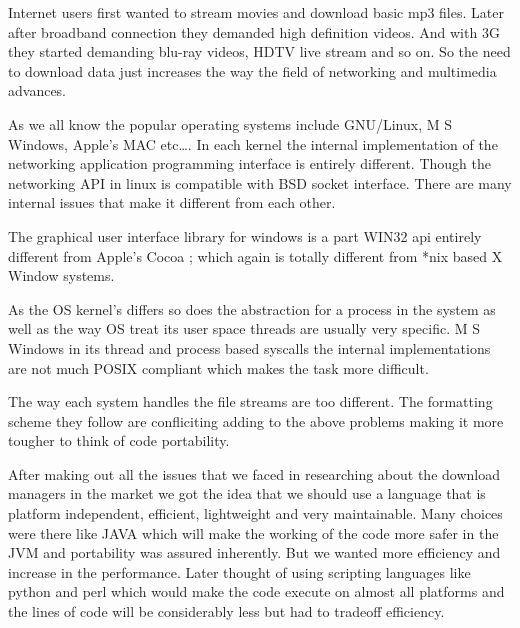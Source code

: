 \documentclass[pdftex,12pt,a4paper,pdfencoding=unicode]{article}
\begin{document}
\begin{onehalfspace}
      Internet users first wanted to stream movies and download basic mp3 files. Later after broadband connection they demanded high
      definition videos. And with 3G they started demanding blu-ray videos, HDTV live stream and so on. So the need to download data
      just increases the way the field of networking and multimedia advances.

      As we all know the popular operating systems include GNU/Linux, M S Windows, Apple's MAC etc\ldots. In each kernel the internal
      implementation of the networking application programming interface is entirely different. Though the networking API in linux is
      compatible with BSD socket interface. There are many internal issues that make it different from each other.

      The graphical user interface library for windows is a part  WIN32 api entirely different from Apple's Cocoa ; which again is totally
      different from *nix based X Window systems.

      As the OS kernel's differs so does the abstraction for a process in the system as well as the way OS treat its user space threads are
      usually very specific. M S Windows in its thread and process based syscalls the internal implementations are not much POSIX compliant
      which makes the task more difficult.

      The way each system handles the file streams are too different. The formatting scheme they follow are confliciting adding to the above
      problems making it more tougher to think of code portability.

      After making out all the issues that we faced in researching about the download managers in the market we got the idea that we should
      use a language that is platform independent, efficient, lightweight and very maintainable. Many choices were there like JAVA which
      will make the working of the code more safer in the JVM and portability was assured inherently. But we wanted more efficiency and
      increase in the performance. Later thought of using scripting languages like python and perl which would make the code execute on
      almost all platforms and the lines of code will be considerably less but had to tradeoff efficiency.


\end{onehalfspace}
\end{document}
